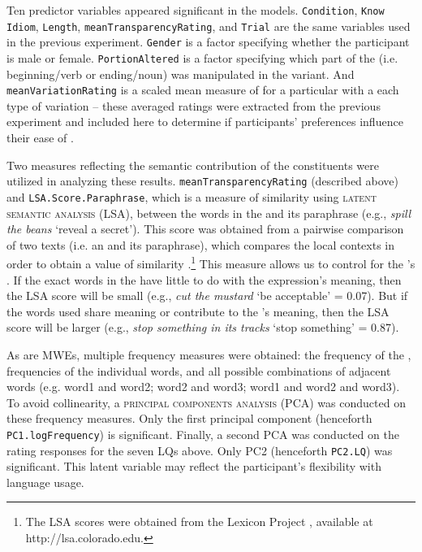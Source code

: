 \documentclass[output=paper
,modfonts
,nonflat]{langsci/langscibook}
\begin{document}
Ten predictor variables appeared significant in the models. \texttt{Condition}, \texttt{Know Idiom}, \texttt{Length}, \texttt{meanTransparencyRating}, and \texttt{Trial} are the same variables used in the previous experiment. \texttt{Gender} is a factor specifying whether the participant is male or female. \texttt{PortionAltered} is a factor specifying which part of the  (i.e. beginning/verb or ending/noun) was manipulated in the variant. And \texttt{meanVariationRating} is a scaled mean measure of  for a particular  with a each type of variation  -- these averaged ratings were extracted from the previous experiment and included here to determine if participants' preferences influence their ease of .

Two measures reflecting the semantic contribution of the constituents were utilized in analyzing these results. \texttt{meanTransparencyRating} (described above) and \texttt{LSA.Score.Paraphrase}, which is a measure of similarity using \textsc{latent semantic analysis} (LSA), between the words in the  and its paraphrase (e.g., \textit{spill the beans} `reveal a secret'). This score was obtained from a pairwise comparison of two texts (i.e. an  and its paraphrase), which compares the local contexts in order to obtain a value of similarity \citep{LandauerEtAl1998}.\footnote{The LSA scores were obtained from the  Lexicon Project \citep{BalotaEtAl2007}, available at http://lsa.colorado.edu.} This measure allows us to control for the 's . If the exact words in the  have little to do with the expression's meaning, then the LSA score will be small (e.g., \textit{cut the mustard} `be acceptable' = 0.07). But if the words used share meaning or contribute to the 's meaning, then the LSA score will be larger (e.g., \textit{stop something in its tracks} `stop something' = 0.87).
   
As  are MWEs,  multiple frequency measures were obtained: the frequency of the , frequencies of the individual words, and all possible combinations of adjacent words (e.g. word1 and word2; word2 and word3; word1 and word2 and word3). To avoid collinearity, a \textsc{principal components analysis} (PCA) was conducted on these frequency measures. Only the first principal component (henceforth \texttt{PC1.logFrequency}) is significant. Finally, a second PCA was conducted on the rating responses for the seven LQs above. Only PC2 (henceforth \texttt{PC2.LQ}) was significant. This latent variable may reflect the participant's flexibility with language usage.
\end{document}
